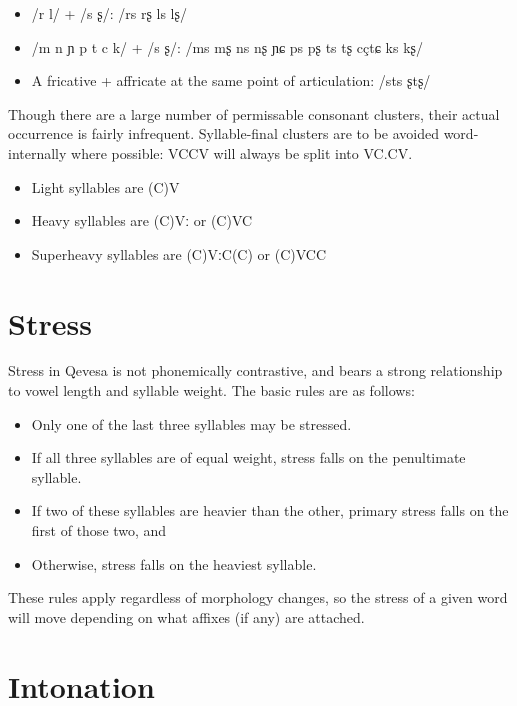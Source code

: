 \documentclass[grammar]{subfiles}
\begin{document}
\begin{itemize}
  \item /r l/ + /s ʂ/: /rs rʂ ls lʂ/
  \item /m n ɲ p t c k/ + /s ʂ/: /ms mʂ ns nʂ ɲɕ ps pʂ ts tʂ cç\tlde tɕ ks kʂ/
  \item A fricative + affricate at the same point of articulation: /sts ʂtʂ/
\end{itemize}

Though there are a large number of permissable consonant clusters, their actual
occurrence is fairly infrequent.  Syllable-final clusters are to be avoided
word-internally where possible: VCCV will always be split into VC.CV\@. 

\begin{itemize}
  \item Light syllables are (C)V
  \item Heavy syllables are (C)Vː or (C)VC
  \item Superheavy syllables are (C)VːC(C) or (C)VCC
\end{itemize}

\section{Stress}
\label{sec:stress}

Stress in Qevesa is not phonemically contrastive, and bears a strong
relationship to vowel length and syllable weight.  The basic rules are as
follows: 

\begin{itemize}
  \item Only one of the last three syllables may be stressed.
  \item If all three syllables are of equal weight, stress falls on the penultimate syllable.
  \item If two of these syllables are heavier than the other, primary stress falls on the first of those two, and 
  \item Otherwise, stress falls on the heaviest syllable.
\end{itemize}

These rules apply regardless of morphology changes, so the stress of a given
word will move depending on what affixes (if any) are attached.

\section{Intonation}
\label{sec:intonation}
\end{document}
